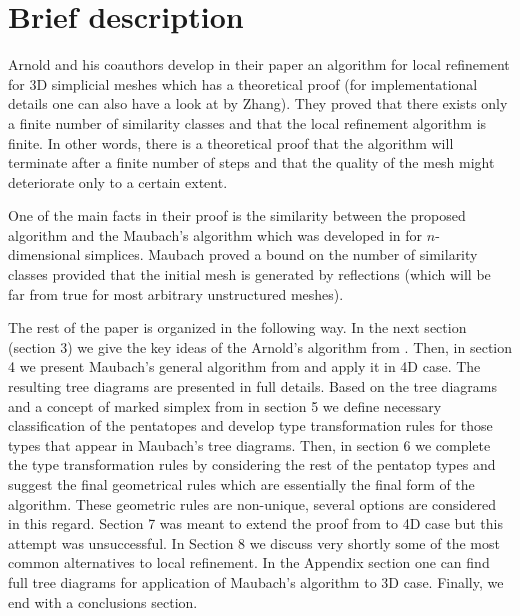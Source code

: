 \documentclass[a4paper,12pt]{amsart}
\numberwithin{equation}{section}
\begin{document}
%	


\section{Brief description}

Arnold and his coauthors develop in their paper \cite{arnold} an algorithm for local refinement for 3D simplicial meshes which has a theoretical proof (for implementational details one can also have a look at \cite{zhang} by Zhang). They proved that there exists only a finite number of similarity classes and that the local refinement algorithm is finite. In other words, there is a theoretical proof that the algorithm will terminate after a finite number of steps and that the quality of the mesh might deteriorate only to a certain extent.

One of the main facts in their proof is the similarity between the proposed algorithm and the Maubach's algorithm which was developed in \cite{maubach} for $n$-dimensional simplices. Maubach proved a bound on the number of similarity classes provided that the initial mesh is generated by reflections (which will be far from true for most arbitrary unstructured meshes).

The rest of the paper is organized in the following way.
In the next section (section 3) we give the key ideas of the Arnold's algorithm from \cite{arnold}.
Then, in section 4 we present Maubach's general algorithm from \cite{maubach} and apply it in 4D case. The resulting tree diagrams are presented in full details. Based on the tree diagrams and a concept of marked simplex from \cite{arnold} in section 5 we define necessary classification of the pentatopes and develop type transformation rules for those types that appear in Maubach's tree diagrams.
Then, in section 6 we complete the type transformation rules by considering the rest of the pentatop types and suggest the final geometrical rules which are essentially the final form of the algorithm. These geometric rules are non-unique, several options are considered in this regard.
Section 7 was meant to extend the proof from \cite{arnold} to 4D case but this attempt was unsuccessful. In Section 8 we discuss very shortly some of the most common alternatives to local refinement.
In the Appendix section one can find full tree diagrams for application of Maubach's algorithm to 3D case.
Finally, we end with a conclusions section.
\end{document}
